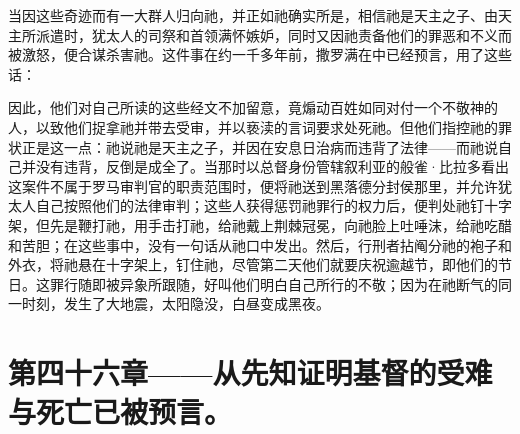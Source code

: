 当因这些奇迹而有一大群人归向祂，并正如祂确实所是，相信祂是天主之子、由天主所派遣时，犹太人的司祭和首领满怀嫉妒，同时又因祂责备他们的罪恶和不义而被激怒，便合谋杀害祂。这件事在约一千多年前，撒罗满在中已经预言，用了这些话：\par

因此，他们对自己所读的这些经文不加留意，竟煽动百姓如同对付一个不敬神的人，以致他们捉拿祂并带去受审，并以亵渎的言词要求处死祂。但他们指控祂的罪状正是这一点：祂说祂是天主之子，并因在安息日治病而违背了法律——而祂说自己并没有违背，反倒是成全了。当那时以总督身份管辖叙利亚的般雀·比拉多看出这案件不属于罗马审判官的职责范围时，便将祂送到黑落德分封侯那里，并允许犹太人自己按照他们的法律审判；这些人获得惩罚祂罪行的权力后，便判处祂钉十字架，但先是鞭打祂，用手击打祂，给祂戴上荆棘冠冕，向祂脸上吐唾沫，给祂吃醋和苦胆；在这些事中，没有一句话从祂口中发出。然后，行刑者拈阄分祂的袍子和外衣，将祂悬在十字架上，钉住祂，尽管第二天他们就要庆祝逾越节，即他们的节日。这罪行随即被异象所跟随，好叫他们明白自己所行的不敬；因为在祂断气的同一时刻，发生了大地震，太阳隐没，白昼变成黑夜。\par


\section{第四十六章——从先知证明基督的受难与死亡已被预言。}

